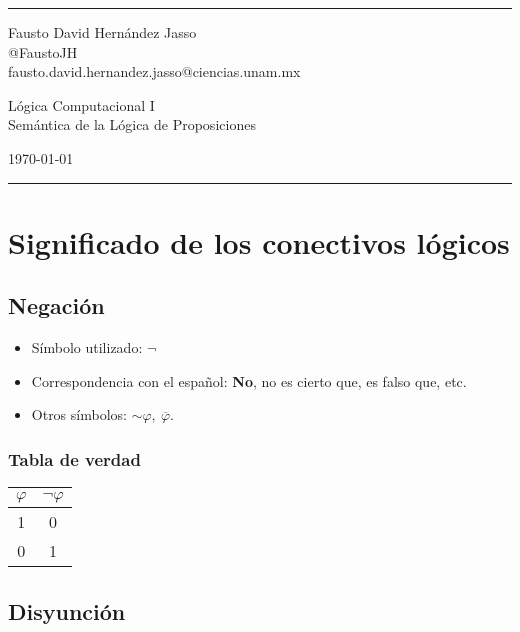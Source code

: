 \documentclass[a4paper]{article}
\begin{document}

\fancyhead[C]{}
\hrule \medskip %
\begin{minipage}{0.35\textwidth} 
\raggedright
\footnotesize
Fausto David Hernández Jasso \hfill\\   
@FaustoJH \hfill\\
fausto.david.hernandez.jasso@ciencias.unam.mx
\end{minipage}
\begin{minipage}{0.4\textwidth} 
\centering 
\large 
Lógica Computacional I\\ 
\normalsize 
Semántica de la Lógica de Proposiciones\\ 
\end{minipage}
\begin{minipage}{0.24\textwidth} 
\raggedleft
\today\hfill\\
\end{minipage}
\medskip\hrule 
\bigskip
\section{Significado de los conectivos lógicos}
\subsection{Negación}
\begin{itemize}
    \item Símbolo utilizado:  $\lnot$ 
    \item Correspondencia con el español: \textbf{No}, no es cierto que, es falso que, 
     etc.
    \item Otros símbolos: $\sim \varphi, \ \overline{\varphi}$. 
\end{itemize}
\subsubsection{Tabla de verdad}
\begin{center}
    \begin{tabular}{cc}
    $\varphi$ & $\neg \varphi$\\
    \midrule
    1 & 0 \\
    0 & 1
    \end{tabular}
\end{center}
\subsection{Disyunción}
\end{document}

